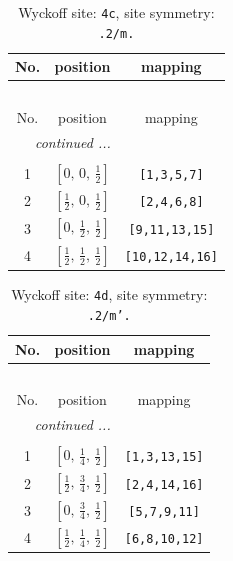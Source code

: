 \documentclass[fleqn,8pt]{jsarticle}
\begin{document}
\renewcommand{\arraystretch}{1.2}
\begin{longtable}{ccc}
\caption{Wyckoff site: {\tt 4c}, site symmetry: {\tt .2/m.}}
 \\
 \hline \hline
No. & position & mapping \\ \hline \endfirsthead

\multicolumn{2}{l}{\tablename\ \thetable{}} \\
 \hline \hline
No. & position & mapping \\ \hline \endhead

 \hline \hline
\multicolumn{2}{r}{\footnotesize\it continued ...} \\ \endfoot

 \hline \hline
\multicolumn{2}{r}{} \\ \endlastfoot

1 & $\left[ 0,\, 0,\, \frac{1}{2} \right]$ & {\tt [1,3,5,7]} \\ \hline
2 & $\left[ \frac{1}{2},\, 0,\, \frac{1}{2} \right]$ & {\tt [2,4,6,8]} \\ \hline
3 & $\left[ 0,\, \frac{1}{2},\, \frac{1}{2} \right]$ & {\tt [9,11,13,15]} \\ \hline
4 & $\left[ \frac{1}{2},\, \frac{1}{2},\, \frac{1}{2} \right]$ & {\tt [10,12,14,16]} \\
\end{longtable}
\renewcommand{\arraystretch}{1.2}
\begin{longtable}{ccc}
\caption{Wyckoff site: {\tt 4d}, site symmetry: {\tt .2/m'.}}
 \\
 \hline \hline
No. & position & mapping \\ \hline \endfirsthead

\multicolumn{2}{l}{\tablename\ \thetable{}} \\
 \hline \hline
No. & position & mapping \\ \hline \endhead

 \hline \hline
\multicolumn{2}{r}{\footnotesize\it continued ...} \\ \endfoot

 \hline \hline
\multicolumn{2}{r}{} \\ \endlastfoot

1 & $\left[ 0,\, \frac{1}{4},\, \frac{1}{2} \right]$ & {\tt [1,3,13,15]} \\ \hline
2 & $\left[ \frac{1}{2},\, \frac{3}{4},\, \frac{1}{2} \right]$ & {\tt [2,4,14,16]} \\ \hline
3 & $\left[ 0,\, \frac{3}{4},\, \frac{1}{2} \right]$ & {\tt [5,7,9,11]} \\ \hline
4 & $\left[ \frac{1}{2},\, \frac{1}{4},\, \frac{1}{2} \right]$ & {\tt [6,8,10,12]} \\
\end{longtable}
\end{document}
